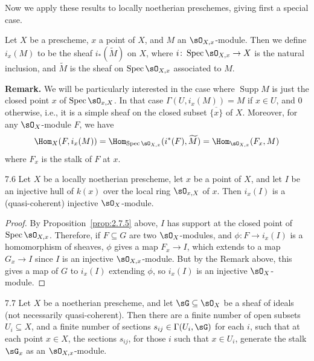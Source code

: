 Now we apply these results to locally noetherian preschemes, giving first a special case.

\begin{definition*}
Let $X$ be a prescheme, $x$ a point of $X$, and $M$ an $\sO_{X,x}$-module. Then we define $i_x(M)$ to be the sheaf $i_*(\widetilde{M})$ on $X$, where $i\colon \operatorname{Spec}\sO_{X,x}\to X$ is the natural inclusion, and $\widetilde{M}$ is the sheaf on $\operatorname{Spec}\sO_{X,x}$ associated to $M$.
\end{definition*}

\textbf{Remark.}
We will be particularly interested in the case where $\operatorname{Supp}M$ is just the closed point $x$ of $\operatorname{Spec}\sO_{x,X}$. In that case $\Gamma(U,i_x(M))=M$ if $x\in U$, and $0$ otherwise, i.e., it is a simple sheaf on the closed subset $\overline{\{x\}}$ of $X$. Moreover, for any $\sO_X$-module $F$, we have
\[
\Hom_X(F, i_x(M)) = \Hom_{\operatorname{Spec}\sO_{X,x}}(i^*(F), \widetilde{M}) = \Hom_{\sO_{X,x}}(F_x, M)
\]
where $F_x$ is the stalk of $F$ at $x$.

\begin{bookproposition}{7.6}\label{prop:2.7.6}
Let $X$ be a locally noetherian prescheme, let $x$ be a point of $X$, and let $I$ be an injective hull of $k(x)$ over the local ring $\sO_{x,X}$ of $x$. Then $i_x(I)$ is a (quasi-coherent) injective $\sO_X$-module.
\end{bookproposition}

\begin{proof}
By Proposition~\ref{prop:2.7.5} above, $I$ has support at the closed point of $\operatorname{Spec}\sO_{X,x}$. Therefore, if $F\subseteq G$ are two $\sO_X$-modules, and $\phi\colon F\to i_x(I)$ is a homomorphism of sheaves, $\phi$ gives a map $F_x\to I$, which extends to a map $G_x\to I$ since $I$ is an injective $\sO_{X,x}$-module. But by the Remark above, this gives a map of $G$ to $i_x(I)$ extending $\phi$, so $i_x(I)$ is an injective $\sO_X$-module.
\end{proof}

\begin{booklemma}{7.7}\label{lem:2.7.7}
Let $X$ be a noetherian prescheme, and let $\sG\subseteq\sO_X$ be a sheaf of ideals (not necessarily quasi-coherent). Then there are a finite number of open subsets $U_i\subseteq X$, and a finite number of sections $s_{ij}\in\Gamma(U_i,\sG)$ for each $i$, such that at each point $x\in X$, the sections $s_{ij}$, for those $i$ such that $x\in U_i$, generate the stalk $\sG_x$ as an $\sO_{X,x}$-module.
\end{booklemma}

